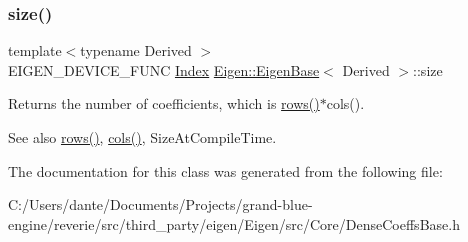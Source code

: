\subsubsection{\texorpdfstring{size()}{size()}}
{\footnotesize\ttfamily template$<$typename Derived $>$ \\
E\+I\+G\+E\+N\+\_\+\+D\+E\+V\+I\+C\+E\+\_\+\+F\+U\+NC \mbox{\hyperlink{struct_eigen_1_1_eigen_base_a554f30542cc2316add4b1ea0a492ff02}{Index}} \mbox{\hyperlink{struct_eigen_1_1_eigen_base}{Eigen\+::\+Eigen\+Base}}$<$ Derived $>$\+::size\hspace{0.3cm}{\ttfamily [inline]}}

\begin{DoxyReturn}{Returns}
the number of coefficients, which is \mbox{\hyperlink{struct_eigen_1_1_eigen_base_a8141320ba8df384426c298b32b000d8e}{rows()}}$\ast$cols(). 
\end{DoxyReturn}
\begin{DoxySeeAlso}{See also}
\mbox{\hyperlink{struct_eigen_1_1_eigen_base_a8141320ba8df384426c298b32b000d8e}{rows()}}, \mbox{\hyperlink{struct_eigen_1_1_eigen_base_a7b0b45c7351847696c911ce8aa2abbdb}{cols()}}, Size\+At\+Compile\+Time. 
\end{DoxySeeAlso}


The documentation for this class was generated from the following file\+:\begin{DoxyCompactItemize}
\item 
C\+:/\+Users/dante/\+Documents/\+Projects/grand-\/blue-\/engine/reverie/src/third\+\_\+party/eigen/\+Eigen/src/\+Core/Dense\+Coeffs\+Base.\+h\end{DoxyCompactItemize}
